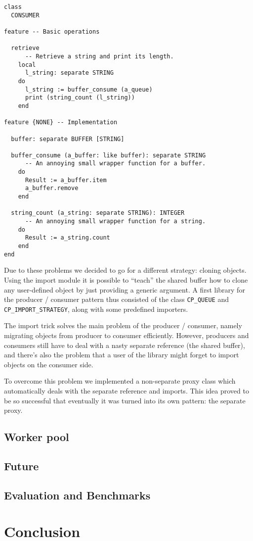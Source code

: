 \documentclass[a4paper,10pt]{report}
\begin{document}
\begin{lstlisting}
class
  CONSUMER

feature -- Basic operations
  
  retrieve
      -- Retrieve a string and print its length.
    local
      l_string: separate STRING
    do
      l_string := buffer_consume (a_queue)
      print (string_count (l_string))
    end
    
feature {NONE} -- Implementation
  
  buffer: separate BUFFER [STRING]

  buffer_consume (a_buffer: like buffer): separate STRING
      -- An annoying small wrapper function for a buffer.
    do
      Result := a_buffer.item
      a_buffer.remove
    end
    
  string_count (a_string: separate STRING): INTEGER
      -- An annoying small wrapper function for a string.
    do
      Result := a_string.count
    end
end
\end{lstlisting}


Due to these problems we decided to go for a different strategy: cloning objects.
Using the import module it is possible to ``teach'' the shared buffer how to clone any user-defined object by just providing a generic argument.
A first library for the producer / consumer pattern thus consisted of the class \lstinline!CP_QUEUE! and \lstinline!CP_IMPORT_STRATEGY!, along with some predefined importers.

The import trick solves the main problem of the producer / consumer, namely migrating objects from producer to consumer efficiently.
However, producers and consumers still have to deal with a nasty separate reference (the shared buffer), and there's also the problem that a user of the library might forget to import objects on the consumer side.

To overcome this problem we implemented a non-separate proxy class which automatically deals with the separate reference and imports.
This idea proved to be so successful that eventually it was turned into its own pattern: the separate proxy.


\subsection{Worker pool}

\subsection{Future}

\subsection{Evaluation and Benchmarks}


\section{Conclusion}

\todos
\end{document}
